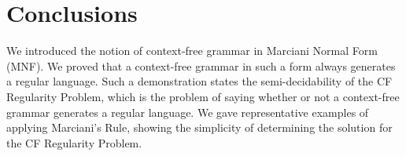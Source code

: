 \section{Conclusions}
\label{sec:conclusions}

We introduced the notion of context-free grammar in Marciani Normal Form (MNF).
We proved that a context-free grammar in such a form always generates a regular
language.
Such a demonstration states the semi-decidability of the CF Regularity Problem,
which is the problem of saying whether or not a context-free grammar generates a
regular language.
We gave representative examples of applying Marciani's Rule, showing the
simplicity of determining the solution for the CF Regularity Problem.
